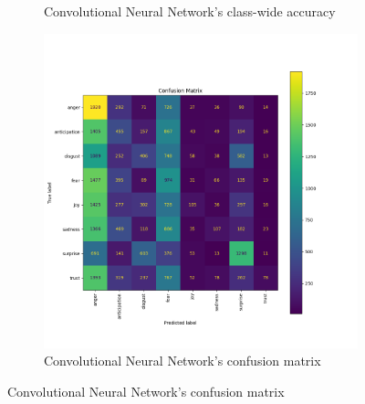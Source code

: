 \begin{figure}[H]
\begin{subfigure}{0.5\textwidth}
        \caption{Convolutional Neural Network's class-wide accuracy}
        \label{fig:rnn_classacc}
    \end{subfigure}
    \begin{subfigure}{0.65\textwidth}
        \includegraphics[width=\textwidth]{pictures/cnn_confusion_matrix.png}
        \caption{Convolutional Neural Network's confusion matrix}
        \label{fig:rnn_confmatr}
    \end{subfigure}
    \label{fig:rnn_performances}
\end{figure}



